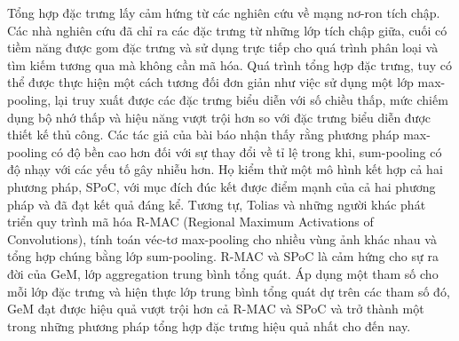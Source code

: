 Tổng hợp đặc trưng lấy cảm hứng từ các nghiên cứu về mạng nơ-ron tích chập. Các nhà nghiên cứu đã chỉ ra các đặc trưng từ những lớp tích chập giữa, cuối có tiềm năng được gom đặc trưng và sử dụng trực tiếp
cho quá trình phân loại và tìm kiếm tương qua mà không cần mã hóa. Quá trình tổng hợp đặc trưng, tuy có thể được thực hiện một cách tương đối đơn giản như việc sử dụng một lớp max-pooling, lại truy xuất được các đặc trưng biểu diễn với số chiều thấp, mức chiếm dụng bộ nhớ thấp và hiệu năng vượt trội hơn so với đặc trưng biểu diễn được thiết kế thủ công. Các tác giả của bài báo \cite{mousavian2015deep} nhận thấy rằng phương pháp max-pooling có độ bền cao hơn đối với sự thay đổi về tỉ lệ trong khi, sum-pooling có độ nhạy với các yếu tố gây nhiễu hơn. Họ kiểm thử một mô hình kết hợp cả hai phương pháp, SPoC, với mục đích đúc kết được điểm mạnh của cả hai phương pháp và đã đạt kết quả đáng kể. Tương tự, Tolias và những người khác\cite{tolias2015particular} phát triển quy trình mã hóa R-MAC (Regional Maximum Activations of Convolutions), tính toán véc-tơ max-pooling cho nhiều vùng ảnh khác nhau và tổng hợp chúng bằng lớp sum-pooling. R-MAC và SPoC là cảm hứng cho sự ra đời của GeM\cite{GeM}, lớp aggregation trung bình tổng quát. Áp dụng một tham số cho mỗi lớp đặc trưng và hiện thực lớp trung bình tổng quát dự trên các tham số đó, GeM đạt được hiệu quả vượt trội hơn cả R-MAC và SPoC và trở thành một trong những phương pháp tổng hợp đặc trưng hiệu quả nhất cho đến nay.